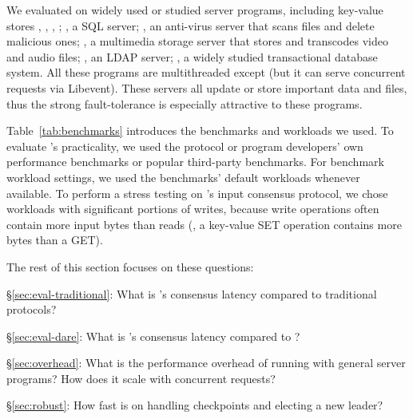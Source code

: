 We evaluated \xxx on \nprog widely used or studied server programs, including
\nkvprog key-value stores \redis, \memcached, \ssdb, \mongodb; \mysql, a SQL
server; \clamav, an anti-virus server that scans files and delete malicious ones;
\mediatomb, a multimedia storage server that stores and transcodes video and
audio files; \openldap, an LDAP server; \calvin, a widely studied transactional
database system. All these programs are multithreaded except \redis (but it can 
serve concurrent requests via Libevent). These servers all update or store 
important data and files, thus the strong \paxos fault-tolerance is especially 
attractive to these programs.

Table~\ref{tab:benchmarks} introduces the benchmarks and workloads we used. To
evaluate \xxx's practicality, we used the protocol or program developers' own 
performance benchmarks or popular third-party benchmarks. For benchmark 
workload settings, we used the benchmarks' default workloads whenever 
available. To perform a stress testing on \xxx's input consensus protocol, we 
chose workloads with significant portions of writes, because write operations 
often contain more input bytes than reads (\eg, a key-value SET operation 
contains more bytes than a GET).



The rest of this section focuses on these questions:

\begin{tightenum}

\item[\S\ref{sec:eval-traditional}:] What is \xxx's consensus latency compared
to traditional \paxos protocols?

\item[\S\ref{sec:eval-dare}:] What is \xxx's consensus latency compared
to \dare?

\item[\S\ref{sec:overhead}:] What is the performance overhead of running \xxx
with general server programs? How does it scale with concurrent requests?


\item[\S\ref{sec:robust}:] How fast is \xxx on handling checkpoints and
electing a new leader?



\end{tightenum}




